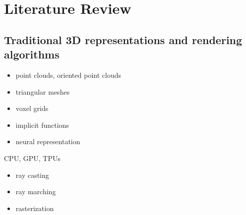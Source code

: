 \chapter{Literature Review}\label{chapter:lit}

\section{Traditional 3D representations and rendering algorithms}
\label{lit:classic-repr}
\begin{itemize}
	\item point clouds, oriented point clouds
	\item triangular meshes
	\item voxel grids
	\item implicit functions
	\item neural representation
\end{itemize}

\alert{CPU, GPU, TPUs}
\label{lit:classic-algo}
\begin{itemize}
	\item ray casting 
	\item ray marching
	\item rasterization
\end{itemize}


